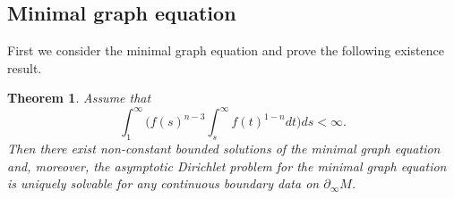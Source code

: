 \documentclass[10pt,a4paper,reqno]{amsart}
\newcommand{\pinf}{\partial_{\infty}}
\numberwithin{equation}{section}
\theoremstyle{plain}
\newtheorem{thm}{Theorem}[section]
\theoremstyle{definition}
\begin{document}
\subsection{Minimal graph equation}  

First we consider the minimal graph equation and prove the following existence result.

\begin{thm} \label{rotsymmingraph}
Assume that 
	\begin{equation}\label{intcond}
	\int_1^{\infty}\Big( f(s)^{n-3} \int_s^{\infty} f(t)^{1-n} dt \Big) ds < \infty.
	\end{equation}
	Then there exist non-constant bounded solutions of the minimal graph equation and, moreover,
	the asymptotic Dirichlet problem for the minimal graph equation is uniquely solvable for any 
	continuous boundary data on $\pinf M$.
\end{thm} 
\end{document}
